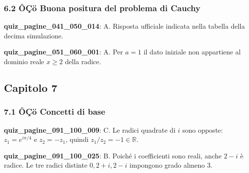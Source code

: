 \documentclass[11pt,a4paper]{article}
\newcounter{quiz}
\begin{document}
\subsubsection*{6.2 ÔÇö Buona positura del problema di Cauchy}
\noindent\textbf{quiz\_pagine\_041\_050\_014}: A. Risposta ufficiale indicata nella tabella della decima simulazione.\par\medskip
\noindent\textbf{quiz\_pagine\_051\_060\_001}: A. Per $a=1$ il dato iniziale non appartiene al dominio reale $x\ge 2$ della radice.\par\medskip
\subsection*{Capitolo 7}
\subsubsection*{7.1 ÔÇö Concetti di base}
\noindent\textbf{quiz\_pagine\_091\_100\_009}: C. Le radici quadrate di $i$ sono opposte: $z_1=e^{i\pi/4}$ e $z_2=-z_1$, quindi $z_1/z_2=-1\in\mathbb R$.\par\medskip
\noindent\textbf{quiz\_pagine\_091\_100\_025}: B. Poiché i coefficienti sono reali, anche $2-i$ è radice. Le tre radici distinte $0,2+i,2-i$ impongono grado almeno $3$.\par\medskip
\end{document}
